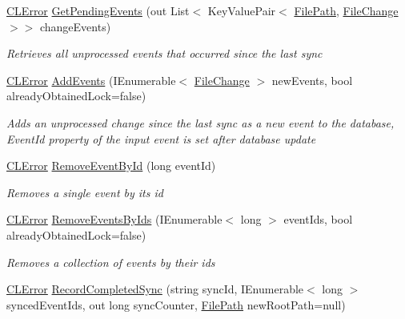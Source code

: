 \begin{DoxyCompactItemize}
\item 
\hyperlink{class_cloud_api_public_1_1_model_1_1_c_l_error}{C\-L\-Error} \hyperlink{class_s_q_l_indexer_1_1_indexing_agent_a342cf10c5fea7b2111ccb518fe66872f}{Get\-Pending\-Events} (out List$<$ Key\-Value\-Pair$<$ \hyperlink{class_cloud_api_public_1_1_model_1_1_file_path}{File\-Path}, \hyperlink{class_cloud_api_public_1_1_model_1_1_file_change}{File\-Change} $>$$>$ change\-Events)
\begin{DoxyCompactList}\small\item\em Retrieves all unprocessed events that occurred since the last sync \end{DoxyCompactList}\item 
\hyperlink{class_cloud_api_public_1_1_model_1_1_c_l_error}{C\-L\-Error} \hyperlink{class_s_q_l_indexer_1_1_indexing_agent_a489c3baaa8767cdf899e609359c7cd8b}{Add\-Events} (I\-Enumerable$<$ \hyperlink{class_cloud_api_public_1_1_model_1_1_file_change}{File\-Change} $>$ new\-Events, bool already\-Obtained\-Lock=false)
\begin{DoxyCompactList}\small\item\em Adds an unprocessed change since the last sync as a new event to the database, Event\-Id property of the input event is set after database update \end{DoxyCompactList}\item 
\hyperlink{class_cloud_api_public_1_1_model_1_1_c_l_error}{C\-L\-Error} \hyperlink{class_s_q_l_indexer_1_1_indexing_agent_a1a32ee8c464595e0197454864a7906bf}{Remove\-Event\-By\-Id} (long event\-Id)
\begin{DoxyCompactList}\small\item\em Removes a single event by its id \end{DoxyCompactList}\item 
\hyperlink{class_cloud_api_public_1_1_model_1_1_c_l_error}{C\-L\-Error} \hyperlink{class_s_q_l_indexer_1_1_indexing_agent_af0ee0c07cb93cbff7d1a162e769e5bcb}{Remove\-Events\-By\-Ids} (I\-Enumerable$<$ long $>$ event\-Ids, bool already\-Obtained\-Lock=false)
\begin{DoxyCompactList}\small\item\em Removes a collection of events by their ids \end{DoxyCompactList}\item 
\hyperlink{class_cloud_api_public_1_1_model_1_1_c_l_error}{C\-L\-Error} \hyperlink{class_s_q_l_indexer_1_1_indexing_agent_aa342de5c56708d670c140e28c1d88b2e}{Record\-Completed\-Sync} (string sync\-Id, I\-Enumerable$<$ long $>$ synced\-Event\-Ids, out long sync\-Counter, \hyperlink{class_cloud_api_public_1_1_model_1_1_file_path}{File\-Path} new\-Root\-Path=null)
$$
\end{DoxyCompactItemize}
